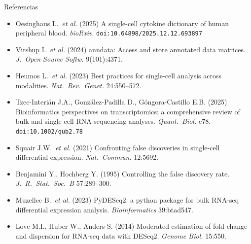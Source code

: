 \documentclass[aspectratio=169,10pt]{beamer}
\begin{document}
\appendix
\begin{frame}{Referencias}
  \scriptsize
  \begin{itemize}\setlength\itemsep{3pt}
    \item Oesinghaus L.\ \emph{et al.} (2025) A single-cell cytokine dictionary of human peripheral blood. \emph{bioRxiv}. \texttt{doi:10.64898/2025.12.12.693897}
    \item Virshup I.\ \emph{et al.} (2024) anndata: Access and store annotated data matrices. \emph{J.\ Open Source Softw.} 9(101):4371.
    \item Heumos L.\ \emph{et al.} (2023) Best practices for single-cell analysis across modalities. \emph{Nat.\ Rev.\ Genet.} 24:550--572.
    \item Tzec-Interi\'an J.A., Gonz\'alez-Padilla D., G\'ongora-Castillo E.B. (2025) Bioinformatics perspectives on transcriptomics: a comprehensive review of bulk and single-cell RNA sequencing analyses. \emph{Quant.\ Biol.} e78. \texttt{doi:10.1002/qub2.78}
    \item Squair J.W.\ \emph{et al.} (2021) Confronting false discoveries in single-cell differential expression. \emph{Nat.\ Commun.} 12:5692.
    \item Benjamini Y., Hochberg Y. (1995) Controlling the false discovery rate. \emph{J.\ R.\ Stat.\ Soc.\ B} 57:289--300.
    \item Muzellec B.\ \emph{et al.} (2023) PyDESeq2: a python package for bulk RNA-seq differential expression analysis. \emph{Bioinformatics} 39:btad547.
    \item Love M.I., Huber W., Anders S. (2014) Moderated estimation of fold change and dispersion for RNA-seq data with DESeq2. \emph{Genome Biol.} 15:550.
  \end{itemize}
\end{frame}
\end{document}
